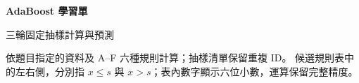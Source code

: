 

\begin{center}
{\Large\bfseries AdaBoost 學習單}\par
三輪固定抽樣計算與預測
\end{center}
依題目指定的資料及 A--F 六種規則計算；抽樣清單保留重複 ID。
候選規則表中的左右側，分別指 $x\le s$ 與 $x>s$；表內數字顯示六位小數，運算保留完整精度。

\clearpage

\clearpage


\clearpage


